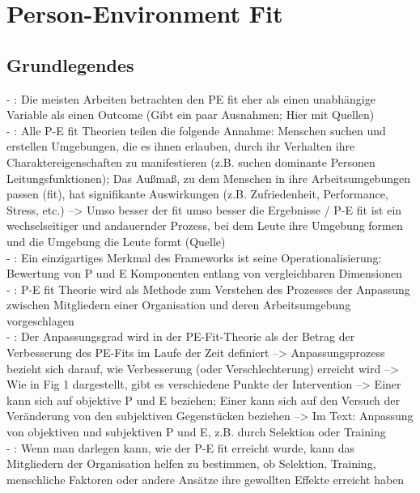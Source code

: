 \chapter{Person-Environment Fit}
\label{ch:personEnvironmentFit}

\section{Grundlegendes}
\label{ch:personEnvironmentFit:grundlegendes}
- \cite[S. 11]{caplan:1993}: Die meisten Arbeiten betrachten den PE fit eher als einen unabhängige Variable als einen Outcome (Gibt ein paar Ausnahmen; Hier mit Quellen) \\
- \cite[S. 3]{su:2015}: Alle P-E fit Theorien teilen die folgende Annahme: Menschen suchen und erstellen Umgebungen, die es ihnen erlauben, durch ihr Verhalten ihre Charaktereigenschaften zu manifestieren (z.B. suchen dominante Personen Leitungsfunktionen); Das Außmaß, zu dem Menschen in ihre Arbeitsumgebungen passen (fit), hat signifikante Auswirkungen (z.B. Zufriedenheit, Performance, Stress, etc.) --> Umso besser der fit umso besser die Ergebnisse / P-E fit ist ein wechselseitiger und andauernder Prozess, bei dem Leute ihre Umgebung formen und die Umgebung die Leute formt (Quelle) \\
- \cite[S. 1]{caplan:1987}: Ein einzigartiges Merkmal des Frameworks ist seine Operationalisierung: Bewertung von P und E  Komponenten entlang von vergleichbaren Dimensionen \\
- \cite[S. 2]{caplan:1987}: P-E fit Theorie wird als Methode zum Verstehen des Prozesses der Anpassung zwischen Mitgliedern einer Organisation und deren Arbeitsumgebung vorgeschlagen \\
- \cite[S. 4]{caplan:1987}: Der Anpassungsgrad wird in der PE-Fit-Theorie als der Betrag der Verbesserung des PE-Fits im Laufe der Zeit definiert --> Anpassungsprozess bezieht sich darauf, wie Verbesserung (oder Verschlechterung) erreicht wird --> Wie in Fig 1 dargestellt, gibt es verschiedene Punkte der Intervention --> Einer kann sich auf objektive P und E beziehen; Einer kann sich auf den Versuch der Veränderung von den subjektiven Gegenstücken beziehen --> Im Text: Anpassung von objektiven und subjektiven P und E, z.B. durch Selektion oder Training \\
- \cite[S. 4]{caplan:1987}: Wenn man darlegen kann, wie der P-E fit erreicht wurde, kann das Mitgliedern der Organisation helfen zu bestimmen, ob Selektion, Training, menschliche Faktoren oder andere Ansätze ihre gewollten Effekte erreicht haben\\
